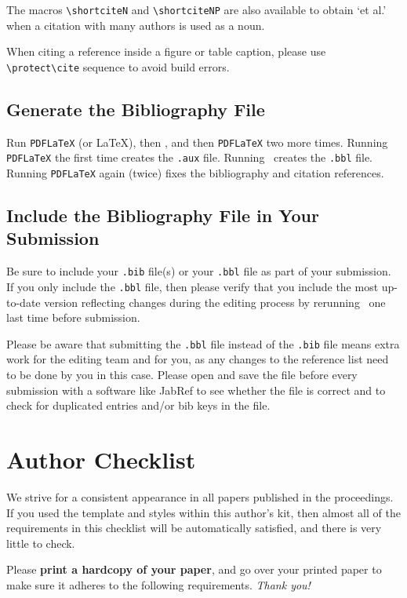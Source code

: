 \documentclass{scspaperproc}
\theoremstyle{scsthe}
\begin{document}
The macros \verb+\shortciteN+ and \verb+\shortciteNP+ are also available to obtain `et al.' when a citation with many authors is used as a noun.

When citing a reference inside a figure or table caption, please use \verb+\protect\cite+ sequence to avoid build errors.


\subsection{Generate the Bibliography File}

Run \texttt{PDFLaTeX} (or \LaTeX), then \BibTeX, and then \texttt{PDFLaTeX} two more times. Running \texttt{PDFLaTeX} the first time creates the \texttt{.aux} file. Running \BibTeX\ creates the \texttt{.bbl} file.  Running \texttt{PDFLaTeX} again (twice) fixes the bibliography and citation references.


\subsection{Include the Bibliography File in Your Submission}
\label{sec:submitbib}

Be sure to include your \texttt{.bib} file(s) or your \texttt{.bbl} file as part of your submission. If you only include the \texttt{.bbl} file, then please verify that you include the most up-to-date version reflecting changes during the editing process by rerunning \BibTeX\ one last time before submission.

Please be aware that submitting the \texttt{.bbl} file instead of the \texttt{.bib} file means extra work for the editing team and for you, as any changes to the reference list need to be done by you in this case.
Please open and save the file before every submission with a software like JabRef to see whether the file is correct and to check for duplicated entries and/or bib keys in the file.


\section{Author Checklist}
We strive for a consistent appearance in all papers published in the proceedings. If you used the template and styles within this author’s kit, then almost all of the requirements in this checklist will be automatically satisfied, and there is very little to check.

Please \textbf{print a hardcopy of your paper}, and go over your printed paper to make sure it adheres to the following requirements. \textit{Thank you!}
\end{document}
